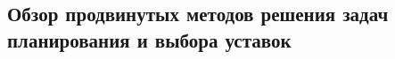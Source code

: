     
    
    
    
    
    




\subsection{Обзор продвинутых методов решения задач планирования и выбора уставок}

